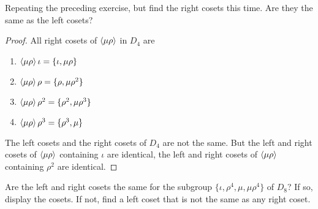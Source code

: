 \newpage
\begin{exercise}
    Repeating the preceding exercise, but find the right cosets this time. Are they the same as the left cosets?
\end{exercise}

\begin{proof}
    All right cosets of $\left\langle{\mu\rho}\right\rangle$ in $D_{4}$ are
    \begin{enumerate}[label={(\arabic*)}]
        \item $\left\langle{\mu\rho}\right\rangle\iota = \{ \iota, \mu\rho \}$
        \item $\left\langle{\mu\rho}\right\rangle\rho = \{ \rho, \mu\rho^{2} \}$
        \item $\left\langle{\mu\rho}\right\rangle\rho^{2} = \{ \rho^{2}, \mu\rho^{3} \}$
        \item $\left\langle{\mu\rho}\right\rangle\rho^{3} = \{ \rho^{3}, \mu \}$
    \end{enumerate}

    The left cosets and the right cosets of $D_{4}$ are not the same. But the left and right cosets of $\left\langle{\mu\rho}\right\rangle$ containing $\iota$ are identical, the left and right cosets of $\left\langle{\mu\rho}\right\rangle$ containing $\rho^{2}$ are identical.
\end{proof}

\newpage
\begin{exercise}
    Are the left and right cosets the same for the subgroup $\{ \iota, \rho^{4}, \mu, \mu\rho^{4} \}$ of $D_{8}$? If so, display the cosets. If not, find a left coset that is not the same as any right coset.
\end{exercise}

